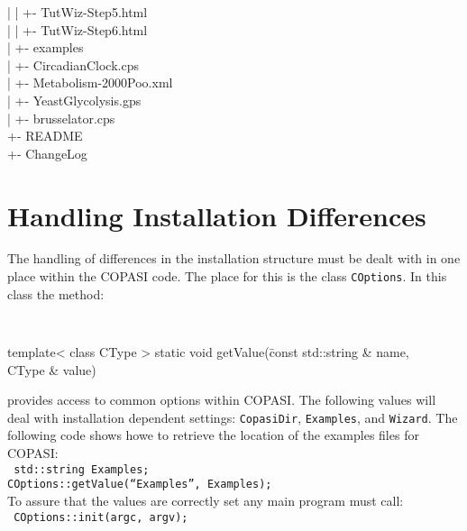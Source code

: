 \documentclass[12pt]{book}
\begin{document}
{\begin{tabbing}
 \> | \> \> | \> \> +- TutWiz-Step5.html \\
 \> | \> \> | \> \> +- TutWiz-Step6.html \\
 \> | \> \> +- examples \\
 \> | \> \> \> +- CircadianClock.cps \\
 \> | \> \> \> +- Metabolism-2000Poo.xml \\
 \> | \> \> \> +- YeastGlycolysis.gps \\
 \> | \> \> \> +- brusselator.cps \\
 \> +- README \\
 \> +- ChangeLog \\
\end{tabbing}
}

\section{Handling Installation Differences}
The handling of differences in the installation structure must be
dealt with in one place within the COPASI code. The place for this is
the class {\tt COptions}. In this class the method:
{\tt \scriptsize
\begin{tabbing}
template< class CType > static void getValue(\=const std::string \&
name, \\
\> CType \& value)
\end{tabbing}
}
\noindent
provides access to common options within COPASI. The following values
will deal with installation dependent settings:
{\tt CopasiDir}, {\tt Examples}, and {\tt Wizard}. The following code
shows howe to retrieve the location of the examples files for COPASI: \\
{\tt \scriptsize
\indent std::string Examples; \\[-4 pt]
\indent COptions::getValue(``Examples'', Examples); \\
}
\noindent
To assure that the values are correctly set any main program must
call: \\
{\tt \scriptsize
\indent       COptions::init(argc, argv);
}
\end{document}
